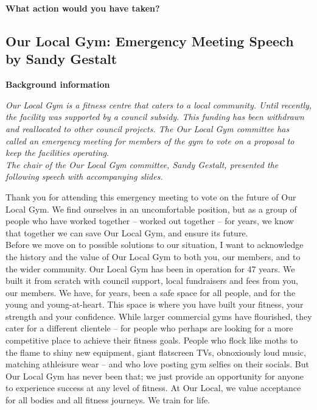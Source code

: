 \documentclass[a4paper]{article}
\begin{document}
\textbf{What action would you have taken?}\\

\newpage
\subsection{Our Local Gym: Emergency Meeting Speech by Sandy Gestalt}

\textbf{Background information}

\textit{Our Local Gym is a fitness centre that caters to a local community. Until recently, the facility was supported by a council subsidy. This funding has been withdrawn and reallocated to other council projects. The Our Local Gym committee has called an emergency meeting for members of the gym to vote on a proposal to keep the facilities operating.}\\

\textit{The chair of the Our Local Gym committee, Sandy Gestalt, presented the following speech with accompanying slides.}\\

\medskip

Thank you for attending this emergency meeting to vote on the future of Our Local Gym. We find ourselves in an uncomfortable position, but as a group of people who have worked together – worked out together – for years, we know that together we can save Our Local Gym, and ensure its future.\\

Before we move on to possible solutions to our situation, I want to acknowledge the history and the value of Our Local Gym to both you, our members, and to the wider community. Our Local Gym has been in operation for 47 years. We built it from scratch with council support, local fundraisers and fees from you, our members. We have, for years, been a safe space for all people, and for the young and young-at-heart. This space is where you have built your fitness, your strength and your confidence. While larger commercial gyms have flourished, they cater for a different clientele – for people who perhaps are looking for a more competitive place to achieve their fitness goals. People who flock like moths to the flame to shiny new equipment, giant flatscreen TVs, obnoxiously loud music, matching athleisure wear – and who love posting gym selfies on their socials. But Our Local Gym has never been that; we just provide an opportunity for anyone to experience success at any level of fitness. At Our Local, we value acceptance for all bodies and all fitness journeys. We train for life.\\
\end{document}
